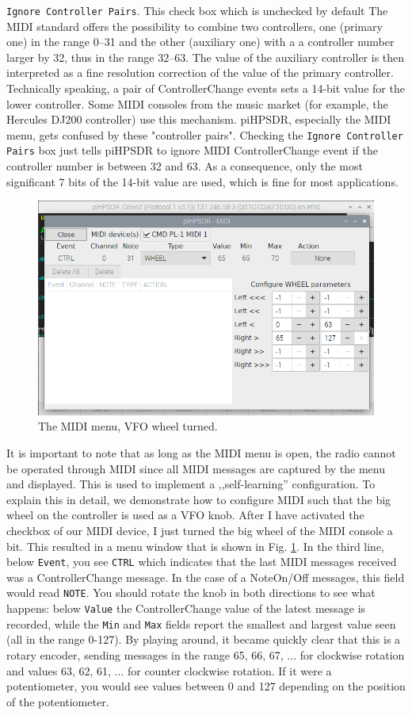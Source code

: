 \documentclass[12pt]{book}
\def\rett#1{\texttt{\color{red}#1}}
\def\pH{pi\-HPSDR\xspace}
\begin{document}
\rett{Ignore Controller Pairs}. This check box  which is unchecked by default
The MIDI standard offers the possibility to combine two controllers, one
(primary one) in the range 0--31 and the other (auxiliary one)
with a a controller number larger by 32, thus in
the range 32--63. The value of the auxiliary controller is then interpreted as a
fine resolution correction of the value of the primary controller. Technically
speaking,
a pair of ControllerChange events sets a 14-bit value for the lower controller.
Some MIDI consoles
from the music market (for example, the Hercules DJ200 controller)
use this mechanism. \pH, especially the MIDI menu, gets confused
by these "controller pairs". Checking the \rett{Ignore Controller Pairs} box just tells
\pH to ignore MIDI ControllerChange event if the controller number is between 32 and 63.
As a consequence, only the most significant 7 bits of the 14-bit value are used, which
is fine for most applications.

\begin{figure}[ht]
\center
\includegraphics[width=12cm]{MIDImenu2.png}
\caption{The MIDI menu, VFO wheel turned.}
\label{fig:MIDImenu2}
\end{figure}

It is important to note that as long as the MIDI menu is open, the radio cannot be
operated through MIDI since all MIDI messages are captured by the menu and
displayed. This is used to implement a ,,self-learning'' configuration. To explain
this in detail, we demonstrate how to configure MIDI such that the big wheel on the
controller is used as a VFO knob. After I have activated the checkbox of our
MIDI device, I just turned the big wheel of the MIDI console a bit. This resulted
in a menu window that is shown in Fig. \ref{fig:MIDImenu2}. In the third line,
below \rett{Event}, you see \texttt{CTRL} which indicates that the last MIDI messages
received was a ControllerChange message. In the case of a NoteOn/Off messages, this
field would read \texttt{NOTE}. You should rotate the knob in both directions to
see what happens: below \rett{Value} the ControllerChange value of the latest
message is recorded, while the \rett{Min} and \rett{Max} fields report the smallest
and largest value seen (all in the range 0-127). By playing around, it became
quickly clear that this is a rotary encoder, sending messages in the range 65, 66, 67,
$\ldots$ for clockwise rotation and values 63, 62, 61, $\ldots$ for counter clockwise
rotation. If it were a potentiometer, you would see values between 0 and 127
depending on the position of the potentiometer.
\end{document}
